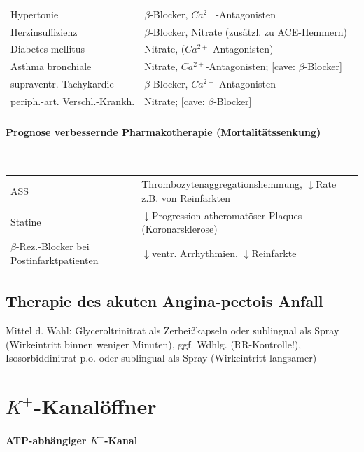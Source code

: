 \documentclass[10pt,a4paper]{report}
\begin{document}
\begin{tabularx}{\textwidth}{XX}
Hypertonie&$\beta$-Blocker, $Ca^{2+}$-Antagonisten\\
Herzinsuffizienz&$\beta$-Blocker, Nitrate (zusätzl. zu ACE-Hemmern)\\
Diabetes mellitus&Nitrate, ($Ca^{2+}$-Antagonisten)\\
Asthma bronchiale&Nitrate, $Ca^{2+}$-Antagonisten; [cave: $\beta$-Blocker]\\
supraventr. Tachykardie&$\beta$-Blocker, $Ca^{2+}$-Antagonisten\\
periph.-art. Verschl.-Krankh.&Nitrate; [cave: $\beta$-Blocker]\\
\end{tabularx}

\paragraph{Prognose verbessernde Pharmakotherapie (Mortalitätssenkung)} \mbox{} \\


\begin{tabularx}{\textwidth}{XX}
ASS&Thrombozytenaggregationshemmung,  $\downarrow$Rate z.B. von Reinfarkten \\
Statine&$\downarrow$Progression atheromatöser Plaques (Koronarsklerose)\\
$\beta$-Rez.-Blocker bei Postinfarktpatienten& $\downarrow$ventr. Arrhythmien, $\downarrow$Reinfarkte\\ 
\end{tabularx}

\subsection{Therapie des akuten Angina-pectois Anfall}

Mittel d. Wahl: Glyceroltrinitrat als Zerbeißkapseln oder sublingual als Spray (Wirkeintritt binnen weniger Minuten), ggf. Wdhlg. (RR-Kontrolle!), Isosorbiddinitrat p.o. oder sublingual als Spray (Wirkeintritt langsamer)

\section{$K^+$-Kanalöffner}
\paragraph{ATP-abhängiger $K^+$-Kanal}
\end{document}

